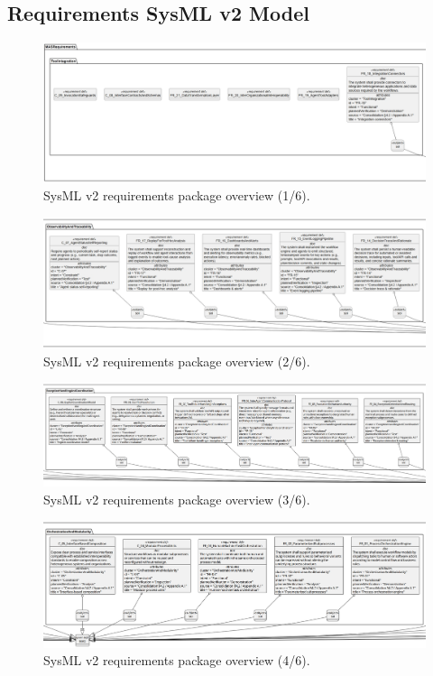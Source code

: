 \clearpage
\subsection*{Requirements SysML v2 Model}\label{app:req-mod}

\begin{figure}[htbp]
  \centering
  \includegraphics[width=\linewidth]{ressources/MAS/figures/MASRequirements/MASRequirements1.jpeg}
  \caption{SysML v2 requirements package overview (1/6).}
  \label{fig:mas-reqs-1}
\end{figure}
\begin{figure}[htbp]
  \centering
  \includegraphics[width=\linewidth]{ressources/MAS/figures/MASRequirements/MASRequirements2.jpeg}
  \caption{SysML v2 requirements package overview (2/6).}
  \label{fig:mas-reqs-2}
\end{figure}
\begin{figure}[htbp]
  \centering
  \includegraphics[width=\linewidth]{ressources/MAS/figures/MASRequirements/MASRequirements3.jpeg}
  \caption{SysML v2 requirements package overview (3/6).}
  \label{fig:mas-reqs-3}
\end{figure}
\begin{figure}[htbp]
  \centering
  \includegraphics[width=\linewidth]{ressources/MAS/figures/MASRequirements/MASRequirements4.jpeg}
  \caption{SysML v2 requirements package overview (4/6).}
  \label{fig:mas-reqs-4}
\end{figure}
